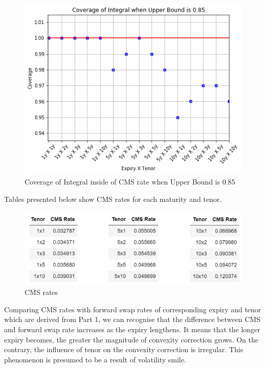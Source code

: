 \documentclass{article}
\begin{document}
\begin{figure}[h]
	\centering
	\includegraphics[scale=0.48]{Coverage.png}
	\caption{Coverage of Integral inside of CMS rate when Upper Bound is 0.85}
\end{figure}

Tables presented below show CMS rates for each maturity and tenor. 

\begin{figure}[h]
	\centering
	\includegraphics[scale=0.40]{CMS_RATE.png}
	\caption{CMS rates}
\end{figure}

\noindent Comparing CMS rates with forward swap rates of corresponding expiry and tenor which are derived from Part 1, we can recognise that the difference between CMS and forward swap rate increases as the expiry lengthens. It means that the longer expiry becomes, the greater the magnitude of convexity correction grows. On the contrary, the influence of tenor on the convexity correction is irregular. This phenomenon is presumed to be a result of volatility smile. 
\end{document}
